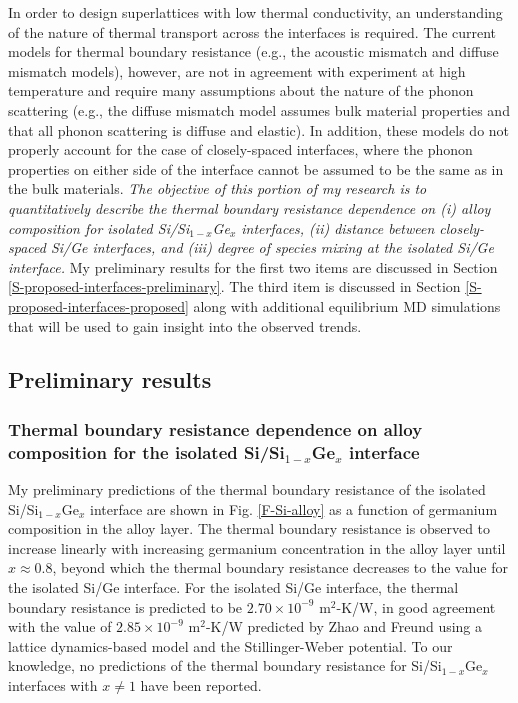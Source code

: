 \documentclass[letterpaper,12pt]{article}
\begin{document}
In order to design superlattices with low thermal conductivity, an
understanding of the nature of thermal transport across the
interfaces is required. The current models for thermal boundary
resistance (e.g., the acoustic mismatch and diffuse mismatch
models), however, are not in agreement with experiment at high
temperature and require many assumptions about the nature of the
phonon scattering (e.g., the diffuse mismatch model assumes bulk
material properties and that all phonon scattering is diffuse and
elastic\cite{swartz1989}). In addition, these models do not properly
account for the case of closely-spaced interfaces, where the phonon
properties on either side of the interface cannot be assumed to be
the same as in the bulk materials. \textit{The objective of this
portion of my research is to quantitatively describe the thermal
boundary resistance dependence on (i) alloy composition for isolated
Si/Si$_{1-x}$Ge$_x$ interfaces, (ii) distance between closely-spaced
Si/Ge interfaces, and (iii) degree of species mixing at the isolated
Si/Ge interface.} My preliminary results for the first two items are
discussed in Section \ref{S-proposed-interfaces-preliminary}. The
third item is discussed in Section
\ref{S-proposed-interfaces-proposed} along with additional
equilibrium MD simulations that will be used to gain insight into
the observed trends.

\subsection{\label{S-proposed-interfaces-preliminary}Preliminary results}

\subsubsection*{Thermal boundary resistance dependence on alloy
composition for the isolated Si/Si$_{1-x}$Ge$_x$ interface}


My preliminary predictions of the thermal boundary resistance of the
isolated Si/Si$_{1-x}$Ge$_x$ interface are shown in Fig.
\ref{F-Si-alloy} as a function of germanium composition in the alloy
layer. The thermal boundary resistance is observed to increase
linearly with increasing germanium concentration in the alloy layer
until $x\approx0.8$, beyond which the thermal boundary resistance
decreases to the value for the isolated Si/Ge interface. For the
isolated Si/Ge interface, the thermal boundary resistance is
predicted to be $2.70 \times 10^{-9}$ m$^2$-K/W, in good agreement
with the value of $2.85 \times 10^{-9}$ m$^2$-K/W predicted by Zhao
and Freund\cite{zhao2005} using a lattice dynamics-based model and
the Stillinger-Weber potential. To our knowledge, no predictions of
the thermal boundary resistance for Si/Si$_{1-x}$Ge$_x$ interfaces
with $x \neq 1$ have been reported.
\end{document}
